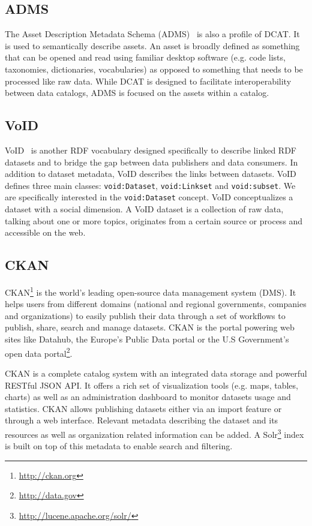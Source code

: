 \subsection{ADMS}
The Asset Description Metadata Schema (ADMS)~\cite{Archer:W3C:13} is also a profile of DCAT. It is used to semantically describe assets. An asset is broadly defined as something that can be opened and read using familiar desktop software (e.g. code lists, taxonomies, dictionaries, vocabularies) as opposed to something that needs to be processed like raw data. While DCAT is designed to facilitate interoperability between data catalogs, ADMS is focused on the assets within a catalog.

\subsection{VoID}
VoID~\cite{Bohm:WebSemJournal:11} is another RDF vocabulary designed specifically to describe linked RDF datasets and to bridge the gap between data publishers and data consumers. In addition to dataset metadata, VoID describes the links between datasets. VoID defines three main classes: \texttt{void:Dataset}, \texttt{void:Linkset} and \texttt{void:subset}. We are specifically interested in the \texttt{void:Dataset} concept. VoID conceptualizes a dataset with a social dimension. A VoID dataset is a collection of raw data, talking about one or more topics, originates from a certain source or process and accessible on the web.

\subsection{CKAN}
CKAN\footnote{\url{http://ckan.org}} is the world's leading open-source data management system (DMS). It helps users from different domains (national and regional governments, companies and organizations) to easily publish their data through a set of workflows to publish, share, search and manage datasets. CKAN is the portal powering web sites like Datahub, the Europe's Public Data portal or the U.S Government's open data portal\footnote{\url{http://data.gov}}.

CKAN is a complete catalog system with an integrated data storage and powerful RESTful JSON API. It offers a rich set of visualization tools (e.g. maps, tables, charts) as well as an administration dashboard to monitor datasets usage and statistics. CKAN allows publishing datasets either via an import feature or through a web interface. Relevant metadata describing the dataset and its resources as well as organization related information can be added. A Solr\footnote{\url{http://lucene.apache.org/solr/}} index is built on top of this metadata to enable search and filtering.

